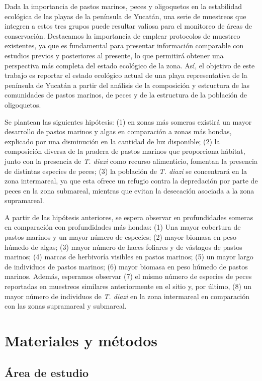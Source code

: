\documentclass[
  authoryear,
  preprint,
  3p,
  twocolumn]{elsarticle}
\begin{document}
Dada la importancia de pastos marinos, peces y oligoquetos en la
estabilidad ecológica de las playas de la península de Yucatán, una
serie de muestreos que integren a estos tres grupos puede resultar
valiosa para el monitoreo de áreas de conservación. Destacamos la
importancia de emplear protocolos de muestreo existentes, ya que es
fundamental para presentar información comparable con estudios previos y
posteriores al presente, lo que permitirá obtener una perspectiva más
completa del estado ecológico de la zona. Así, el objetivo de este
trabajo es reportar el estado ecológico actual de una playa
representativa de la península de Yucatán a partir del análisis de la
composición y estructura de las comunidades de pastos marinos, de peces
y de la estructura de la población de oligoquetos.

Se plantean las siguientes hipótesis: (1) en zonas más someras existirá
un mayor desarrollo de pastos marinos y algas en comparación a zonas más
hondas, explicado por una disminución en la cantidad de luz disponible;
(2) la composición diversa de la pradera de pastos marinos que
proporciona hábitat, junto con la presencia de \emph{T. diazi} como
recurso alimenticio, fomentan la presencia de distintas especies de
peces; (3) la población de \emph{T. diazi} se concentrará en la zona
intermareal, ya que esta ofrece un refugio contra la depredación por
parte de peces en la zona submareal, mientras que evitan la desecación
asociada a la zona supramareal.

A partir de las hipótesis anteriores, se espera observar en
profundidades someras en comparación con profundidades más hondas: (1)
Una mayor cobertura de pastos marinos y un mayor número de especies; (2)
mayor biomasa en peso húmedo de algas; (3) mayor número de haces
foliares y de vástagos de pastos marinos; (4) marcas de herbivoría
visibles en pastos marinos; (5) un mayor largo de individuos de pastos
marinos; (6) mayor biomasa en peso húmedo de pastos marinos. Además,
esperamos observar (7) el mismo número de especies de peces reportadas
en muestreos similares anteriormente en el sitio y, por último, (8) un
mayor número de individuos de \emph{T. diazi} en la zona intermareal en
comparación con las zonas supramareal y submareal.

\section{Materiales y métodos}\label{materiales-y-muxe9todos}

\subsection{\texorpdfstring{\textbf{Área de
estudio}}{Área de estudio}}\label{uxe1rea-de-estudio}
\end{document}
